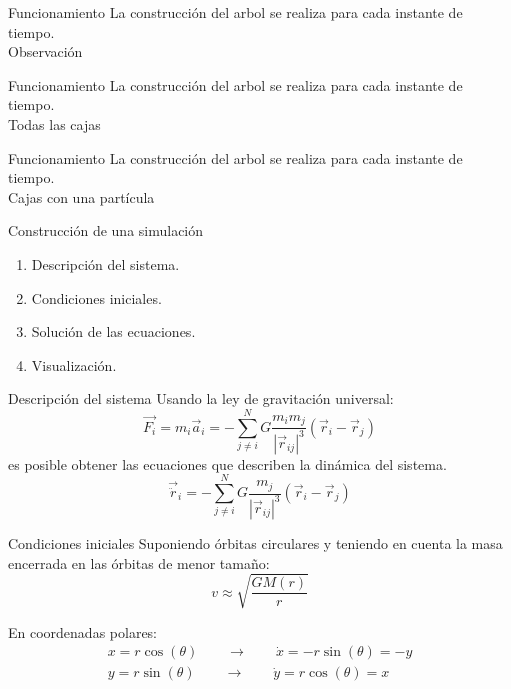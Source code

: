 \documentclass{beamer}
\begin{document}
\begin{frame}{Funcionamiento}
	La construcci\'on del arbol se realiza para cada instante de tiempo.
	\centering
	\\
	Observaci\'on
\end{frame}
\begin{frame}{Funcionamiento}
	La construcci\'on del arbol se realiza para cada instante de tiempo.
	\centering
	\\
	Todas las cajas
\end{frame}
\begin{frame}{Funcionamiento}
	La construcci\'on del arbol se realiza para cada instante de tiempo.
	\centering
	\\
	Cajas con una part\'icula
\end{frame}
\begin{frame}{Construcci\'on de una simulaci\'on}
	\begin{enumerate}
		\item Descripci\'on del sistema. \pause
		\item Condiciones iniciales. \pause
		\item Soluci\'on de las ecuaciones. \pause
		\item Visualizaci\'on.
	\end{enumerate}
\end{frame}
\begin{frame}{Descripci\'on del sistema}
	Usando la ley de gravitaci\'on universal:
	\begin{equation}
		\vec{F_i} = m_i\vec{a}_i = - \sum\limits_{j\neq i}^N G\dfrac{m_im_j}{|\vec{r}_{ij}|^3}\left(\vec{r}_i - \vec{r}_j\right)
	\end{equation}\pause
	es posible obtener las ecuaciones que describen la din\'amica del sistema.\pause
	\begin{equation}
		\vec{\ddot{r}}_i = - \sum\limits_{j\neq i}^N G\dfrac{m_j}{|\vec{r}_{ij}|^3}\left(\vec{r}_i - \vec{r}_j\right)
	\end{equation}
\end{frame}
\begin{frame}{Condiciones iniciales}
	Suponiendo \'orbitas circulares y teniendo en cuenta la masa encerrada en las \'orbitas de menor tama\~no:
	\begin{equation}
		v \approx \sqrt{\dfrac{GM(r)}{r}}
	\end{equation}
	
	En coordenadas polares:
	\begin{equation}
		\begin{matrix}
			x = r\cos(\theta) \qquad \longrightarrow \qquad \dot{x} = -r\sin(\theta) = -y \\
			y = r\sin(\theta) \qquad \longrightarrow \qquad \dot{y} = r\cos(\theta) = x
		\end{matrix}
	\end{equation}
\end{frame}
\end{document}
